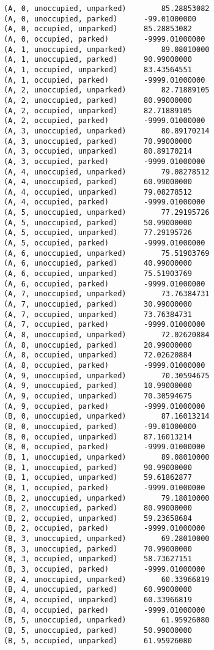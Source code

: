\documentclass[paper=a4, fontsize=11pt]{scrartcl}
\begin{document}
\begin{verbatim}
(A, 0, unoccupied, unparked)		85.28853082
(A, 0, unoccupied, parked)		-99.01000000
(A, 0, occupied, unparked)		85.28853082
(A, 0, occupied, parked)		-9999.01000000
(A, 1, unoccupied, unparked)		89.08010000
(A, 1, unoccupied, parked)		90.99000000
(A, 1, occupied, unparked)		83.43564551
(A, 1, occupied, parked)		-9999.01000000
(A, 2, unoccupied, unparked)		82.71889105
(A, 2, unoccupied, parked)		80.99000000
(A, 2, occupied, unparked)		82.71889105
(A, 2, occupied, parked)		-9999.01000000
(A, 3, unoccupied, unparked)		80.89170214
(A, 3, unoccupied, parked)		70.99000000
(A, 3, occupied, unparked)		80.89170214
(A, 3, occupied, parked)		-9999.01000000
(A, 4, unoccupied, unparked)		79.08278512
(A, 4, unoccupied, parked)		60.99000000
(A, 4, occupied, unparked)		79.08278512
(A, 4, occupied, parked)		-9999.01000000
(A, 5, unoccupied, unparked)		77.29195726
(A, 5, unoccupied, parked)		50.99000000
(A, 5, occupied, unparked)		77.29195726
(A, 5, occupied, parked)		-9999.01000000
(A, 6, unoccupied, unparked)		75.51903769
(A, 6, unoccupied, parked)		40.99000000
(A, 6, occupied, unparked)		75.51903769
(A, 6, occupied, parked)		-9999.01000000
(A, 7, unoccupied, unparked)		73.76384731
(A, 7, unoccupied, parked)		30.99000000
(A, 7, occupied, unparked)		73.76384731
(A, 7, occupied, parked)		-9999.01000000
(A, 8, unoccupied, unparked)		72.02620884
(A, 8, unoccupied, parked)		20.99000000
(A, 8, occupied, unparked)		72.02620884
(A, 8, occupied, parked)		-9999.01000000
(A, 9, unoccupied, unparked)		70.30594675
(A, 9, unoccupied, parked)		10.99000000
(A, 9, occupied, unparked)		70.30594675
(A, 9, occupied, parked)		-9999.01000000
(B, 0, unoccupied, unparked)		87.16013214
(B, 0, unoccupied, parked)		-99.01000000
(B, 0, occupied, unparked)		87.16013214
(B, 0, occupied, parked)		-9999.01000000
(B, 1, unoccupied, unparked)		89.08010000
(B, 1, unoccupied, parked)		90.99000000
(B, 1, occupied, unparked)		59.61862877
(B, 1, occupied, parked)		-9999.01000000
(B, 2, unoccupied, unparked)		79.18010000
(B, 2, unoccupied, parked)		80.99000000
(B, 2, occupied, unparked)		59.23658684
(B, 2, occupied, parked)		-9999.01000000
(B, 3, unoccupied, unparked)		69.28010000
(B, 3, unoccupied, parked)		70.99000000
(B, 3, occupied, unparked)		58.73627151
(B, 3, occupied, parked)		-9999.01000000
(B, 4, unoccupied, unparked)		60.33966819
(B, 4, unoccupied, parked)		60.99000000
(B, 4, occupied, unparked)		60.33966819
(B, 4, occupied, parked)		-9999.01000000
(B, 5, unoccupied, unparked)		61.95926080
(B, 5, unoccupied, parked)		50.99000000
(B, 5, occupied, unparked)		61.95926080

\end{verbatim}
\end{document}
